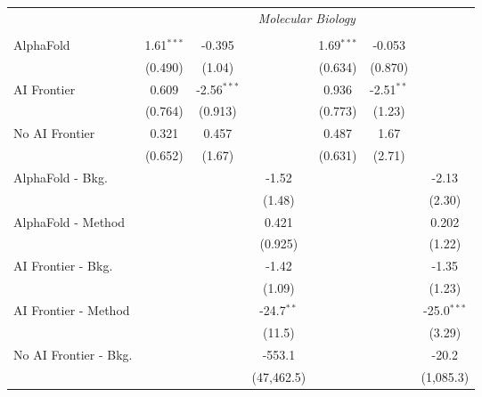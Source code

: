 \begin{tabular}{lcccccc}
 & \multicolumn{6}{c}{\textit{Molecular Biology}} \\ \\
   AlphaFold               & 1.61$^{***}$ & -0.395        &              & 1.69$^{***}$ & -0.053       &   \\   
                           & (0.490)      & (1.04)        &              & (0.634)      & (0.870)      &   \\   
   AI Frontier             & 0.609        & -2.56$^{***}$ &              & 0.936        & -2.51$^{**}$ &   \\   
                           & (0.764)      & (0.913)       &              & (0.773)      & (1.23)       &   \\   
   No AI Frontier          & 0.321        & 0.457         &              & 0.487        & 1.67         &   \\   
                           & (0.652)      & (1.67)        &              & (0.631)      & (2.71)       &   \\   
   AlphaFold - Bkg.        &              &               & -1.52        &              &              & -2.13\\   
                           &              &               & (1.48)       &              &              & (2.30)\\   
   AlphaFold - Method      &              &               & 0.421        &              &              & 0.202\\   
                           &              &               & (0.925)      &              &              & (1.22)\\   
   AI Frontier - Bkg.      &              &               & -1.42        &              &              & -1.35\\   
                           &              &               & (1.09)       &              &              & (1.23)\\   
   AI Frontier - Method    &              &               & -24.7$^{**}$ &              &              & -25.0$^{***}$\\   
                           &              &               & (11.5)       &              &              & (3.29)\\   
   No AI Frontier - Bkg.   &              &               & -553.1       &              &              & -20.2\\   
                           &              &               & (47,462.5)   &              &              & (1,085.3)\\   

\end{tabular}

